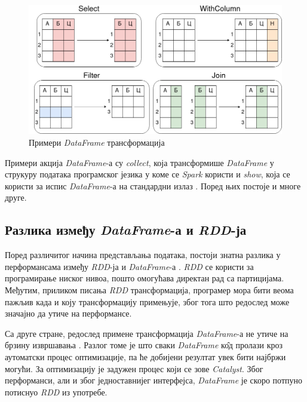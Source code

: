 \documentclass[12pt,oneside]{memoir}
\begin{document}
\begin{figure}[!ht]
  \centering
  \includegraphics[width=1\textwidth]{pictures/df_trnsf_example.png}
  \caption{Примери \textit{DataFrame} трансформација}
  \label{fig:sprk_df_trnsf_example}
\end{figure}

Примери акција \textit{DataFrame}-а су \textit{collect}, која трансформише \textit{DataFrame} у струкуру података програмског језика у коме се \textit{Spark} користи и \textit{show}, која се користи за испис \textit{DataFrame}-а на стандардни излаз \cite{spark_guide}. Поред њих постоје и многе друге.

\subsection{Разлика између \textit{DataFrame}-а и \textit{RDD}-ја}
\label{subsec:spark_df_vs_rdd}

Поред различитог начина представљања података, постоји знатна разлика у перформансама између \textit{RDD}-ја и \textit{DataFrame}-а \cite{spark_guide}. \textit{RDD} се користи за програмирање ниског нивоа, пошто омогућава директан рад са партицијама. Међутим, приликом писања \textit{RDD} трансформација, програмер мора бити веома пажљив када и коју трансформацију примењује, због тога што редослед може значајно да утиче на перформансе.

Са друге стране, редослед примене трансформација \textit{DataFrame}-а не утиче на брзину извршавања \cite{spark_guide}. Разлог томе је што сваки \textit{DataFrame} к\^{о}д пролази кроз аутоматски процес оптимизације, па ће добијени резултат увек бити најбржи могући. За оптимизацију је задужен процес који се зове \textit{Catalyst}. Због перформанси, али и због једноставнијег интерфејса, \textit{DataFrame} је скоро потпуно потиснуо \textit{RDD} из употребе.
\end{document}
